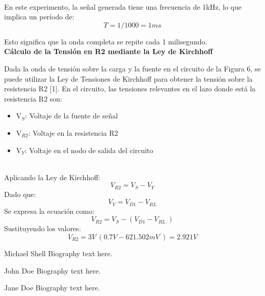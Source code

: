 \documentclass[journal]{IEEEtran}
\begin{document}
\\
\newline
\par En este experimento, la señal generada tiene una frecuencia de 1kHz, lo que implica un período de:
\begin{equation}
    T=1/1000=1ms
\end{equation}
\par Esto significa que la onda completa se repite cada 1 milisegundo. 
\\
\newline
\textbf{Cálculo de la Tensión en R2 mediante la Ley de Kirchhoff}
\par Dada la onda de tensión sobre la carga y la fuente en el circuito de la Figura 6, se puede utilizar la Ley de Tensiones de Kirchhoff para obtener la tensión sobre la resistencia R2 [1]. En el circuito, las tensiones relevantes en el lazo donde está la resistencia R2 son:
\begin{itemize}
	\item V$_S$: Voltaje de la fuente de señal
	\item V$_{R2}$: Voltaje en la resistencia R2
	\item V$_Y$: Voltaje en el nodo de salida del circuito
\end{itemize}
\\
\newline
Aplicando la Ley de Kirchhoff:
\begin{equation}
    V_{R2}=V_S-V_Y
\end{equation}
Dado que:
\begin{equation}
    V_Y=V_{D1}-V_{RL}
\end{equation}
Se expresa la ecuación como:
\begin{equation}
    V_{R2}=V_S-(V_{D1}-V_{RL}\ )
\end{equation}
Sustituyendo los valores:
\begin{equation}
    V_{R2}=3V \ (0.7V-621.502mV\ )=2.921V
\end{equation}


\ifCLASSOPTIONcaptionsoff
  \newpage
\fi


\begin{IEEEbiography}{Michael Shell}
Biography text here.
\end{IEEEbiography}

\begin{IEEEbiographynophoto}{John Doe}
Biography text here.
\end{IEEEbiographynophoto}

\begin{IEEEbiographynophoto}{Jane Doe}
Biography text here.
\end{IEEEbiographynophoto}
\end{document}
